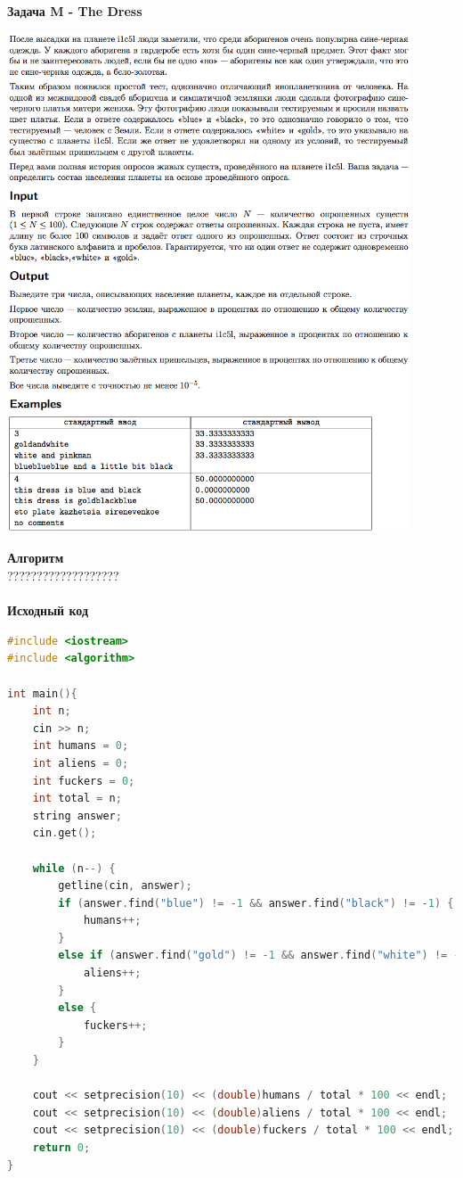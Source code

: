 \documentclass[a4paper,12pt]{article}
\begin{document}
\textbf{{\large Задача M - The Dress}} \\
\begin{center}
\includegraphics[width=0.9\textwidth]{OC_Tatarstan/OC_Tatarstan_M.png}\\ [1cm]
\end{center}
\newpage

\textbf{{\large Алгоритм}} \\
{\Huge ???????????????????} \\ 
\\
\textbf{{\large Исходный код}}
\begin{lstlisting}[language=C++]
#include <iostream>
#include <algorithm>

int main(){
    int n;
    cin >> n;
    int humans = 0;
    int aliens = 0;
    int fuckers = 0;
    int total = n;
    string answer;
    cin.get();

    while (n--) {
        getline(cin, answer);
        if (answer.find("blue") != -1 && answer.find("black") != -1) {
            humans++;
        }
        else if (answer.find("gold") != -1 && answer.find("white") != -1) {
            aliens++;
        }
        else {
            fuckers++;
        }
    }

    cout << setprecision(10) << (double)humans / total * 100 << endl;
    cout << setprecision(10) << (double)aliens / total * 100 << endl;
    cout << setprecision(10) << (double)fuckers / total * 100 << endl;
    return 0;
}
\end{lstlisting}
\end{document}
